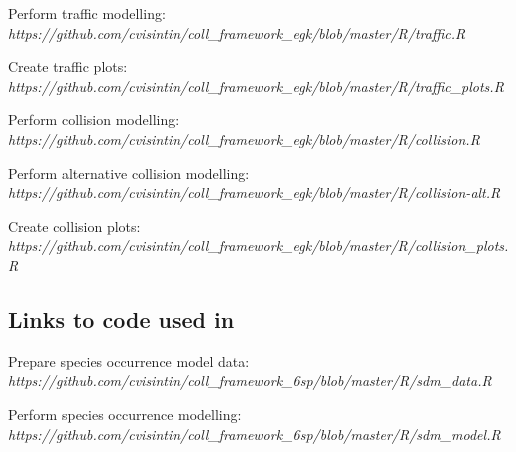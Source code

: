\vspace{.3cm}
\noindent Perform traffic modelling:\\
\textit{https://github.com/cvisintin/coll\_framework\_egk/blob/master/R/traffic.R}
%

\vspace{.3cm}
\noindent Create traffic plots:\\
\textit{https://github.com/cvisintin/coll\_framework\_egk/blob/master/R/traffic\_plots.R}
%

\vspace{.3cm}
\noindent Perform collision modelling:\\
\textit{https://github.com/cvisintin/coll\_framework\_egk/blob/master/R/collision.R}
%

\vspace{.3cm}
\noindent Perform alternative collision modelling:\\
\textit{https://github.com/cvisintin/coll\_framework\_egk/blob/master/R/collision-alt.R}
%

\vspace{.3cm}
\noindent Create collision plots:\\
\textit{https://github.com/cvisintin/coll\_framework\_egk/blob/master/R/collision\_plots.R}
%


\subsection{Links to code used in }

\noindent Prepare species occurrence model data:\\
\textit{https://github.com/cvisintin/coll\_framework\_6sp/blob/master/R/sdm\_data.R}
%

\vspace{.3cm}
\noindent Perform species occurrence modelling:\\
\textit{https://github.com/cvisintin/coll\_framework\_6sp/blob/master/R/sdm\_model.R}
%

